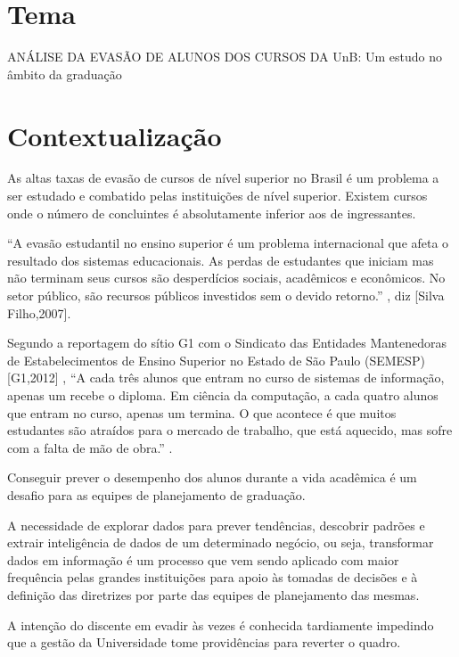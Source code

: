 \section{Tema}%
ANÁLISE DA EVASÃO DE ALUNOS DOS CURSOS DA UnB: Um estudo no âmbito da graduação

\section{Contextualização}%

As altas taxas de evasão de cursos de nível superior no Brasil é um problema a ser estudado e combatido pelas instituições de nível superior. Existem cursos onde o  número de concluintes é absolutamente inferior aos de ingressantes.

 “A evasão estudantil no ensino superior é um problema internacional que afeta o resultado dos sistemas educacionais. As perdas de estudantes que iniciam mas não terminam seus cursos são desperdícios sociais, acadêmicos e econômicos. No setor público, são recursos públicos investidos sem o devido retorno.” , diz [Silva Filho,2007].%

Segundo a reportagem do sítio G1 com o Sindicato das Entidades Mantenedoras de Estabelecimentos de Ensino Superior no Estado de São Paulo (SEMESP) [G1,2012] %
, “A cada três alunos que entram no curso de sistemas de informação, apenas um recebe o diploma.  Em ciência da computação, a cada quatro alunos que entram no curso, apenas um termina. O que acontece é que muitos estudantes são atraídos para o mercado de trabalho, que está aquecido, mas sofre com a falta de mão de obra.” . 

Conseguir prever o desempenho dos alunos durante a vida acadêmica é um desafio para as equipes de planejamento de graduação. 

A necessidade de explorar dados para prever tendências, descobrir padrões e extrair inteligência de dados de um determinado negócio, ou seja, transformar dados em informação é um processo que vem sendo aplicado com  maior frequência pelas grandes instituições para apoio às tomadas de decisões e à definição das diretrizes por parte das equipes de planejamento das mesmas.

A intenção do discente em evadir às vezes é conhecida tardiamente impedindo que a gestão da Universidade tome providências para reverter o quadro.

